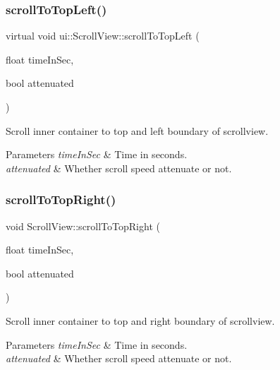 \subsubsection{\texorpdfstring{scroll\+To\+Top\+Left()}{scrollToTopLeft()}\hspace{0.1cm}{\footnotesize\ttfamily [2/2]}}
{\footnotesize\ttfamily virtual void ui\+::\+Scroll\+View\+::scroll\+To\+Top\+Left (\begin{DoxyParamCaption}\item[{float}]{time\+In\+Sec,  }\item[{bool}]{attenuated }\end{DoxyParamCaption})\hspace{0.3cm}{\ttfamily [virtual]}}

Scroll inner container to top and left boundary of scrollview. 
\begin{DoxyParams}{Parameters}
{\em time\+In\+Sec} & Time in seconds. \\
\hline
{\em attenuated} & Whether scroll speed attenuate or not. \\
\hline
\end{DoxyParams}
\mbox{\label{classui_1_1ScrollView_adaaf96b7ae849a819209564879bfb404}} 
\subsubsection{\texorpdfstring{scroll\+To\+Top\+Right()}{scrollToTopRight()}\hspace{0.1cm}{\footnotesize\ttfamily [1/2]}}
{\footnotesize\ttfamily void Scroll\+View\+::scroll\+To\+Top\+Right (\begin{DoxyParamCaption}\item[{float}]{time\+In\+Sec,  }\item[{bool}]{attenuated }\end{DoxyParamCaption})\hspace{0.3cm}{\ttfamily [virtual]}}

Scroll inner container to top and right boundary of scrollview. 
\begin{DoxyParams}{Parameters}
{\em time\+In\+Sec} & Time in seconds. \\
\hline
{\em attenuated} & Whether scroll speed attenuate or not. \\
\hline
\end{DoxyParams}
\mbox{\label{classui_1_1ScrollView_a9993e7d6bc043299c92b61cedef84a1f}} 
